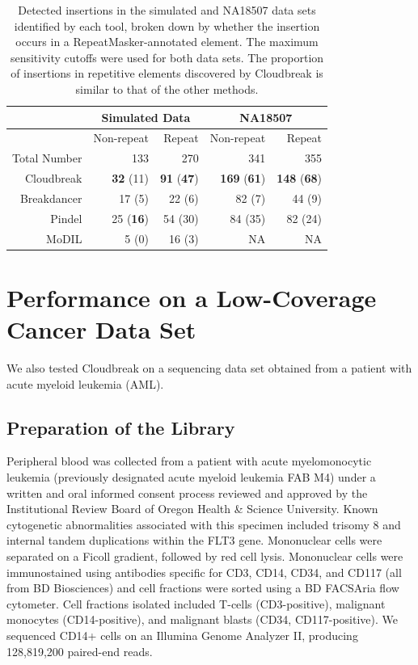 \begin{table}
\begin{center}
\begin{tabular}{rrr|rr}
 & \multicolumn{2}{c}{Simulated Data} & \multicolumn{2}{c}{NA18507} \\
\hline
 &  Non-repeat & Repeat  &  Non-repeat & Repeat \\ 
 Total Number & 133 & 270 & 341 & 355 \\ 
  \hline
  Cloudbreak  & \textbf{32} (11) & \textbf{91} (\textbf{47}) & \textbf{169} (\textbf{61}) & \textbf{148} (\textbf{68}) \\ 
  Breakdancer & 17 (5) & 22 (6) & 82 (7) & 44 (9) \\
  Pindel      & 25 (\textbf{16}) & 54 (30) & 84 (35) & 82 (24) \\ 
  MoDIL      & 5 (0) & 16 (3) & NA & NA \\ 
   \hline
\end{tabular}
\end{center}
\caption{Detected insertions in the simulated and NA18507 data sets identified by each tool, broken down by whether the insertion occurs in a RepeatMasker-annotated element. The maximum sensitivity cutoffs were used for both data sets. The proportion of insertions in repetitive elements discovered by Cloudbreak is similar to that of the other methods.}
\label{insertionRepmaskpreds}
\end{table}

\section{Performance on a Low-Coverage Cancer Data Set}

We also tested Cloudbreak on a sequencing data set obtained from a patient with acute myeloid leukemia (AML). 

\subsection{Preparation of the Library}

Peripheral blood was collected from a patient with acute myelomonocytic leukemia (previously designated acute myeloid leukemia FAB M4) under a written and oral informed consent process reviewed and approved by the Institutional Review Board of Oregon Health \& Science University. Known cytogenetic abnormalities associated with this specimen included trisomy 8 and internal tandem duplications within the FLT3 gene. Mononuclear cells were separated on a Ficoll gradient, followed by red cell lysis. Mononuclear cells were immunostained using antibodies specific for CD3, CD14, CD34, and CD117 (all from BD Biosciences) and cell fractions were sorted using a BD FACSAria flow cytometer. Cell fractions isolated included T-cells (CD3-positive), malignant monocytes (CD14-positive), and malignant blasts (CD34, CD117-positive). We sequenced CD14+ cells on an Illumina Genome Analyzer II, producing 128,819,200 paired-end reads.

